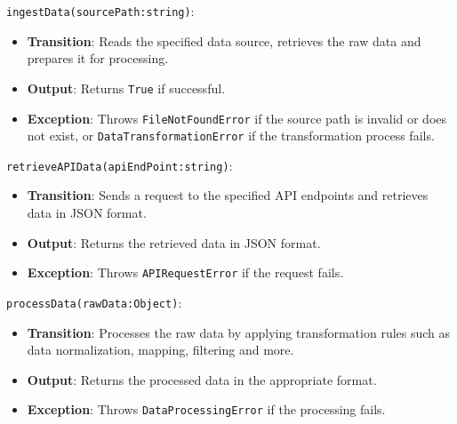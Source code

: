 \documentclass[12pt, titlepage]{article}
\begin{document}
\begin{description}
  \texttt{ingestData(sourcePath:string)}:
  \item
  \begin{itemize}
    \item \textbf{Transition}: Reads the specified data source, retrieves the raw data and prepares
    it for processing.
  \end{itemize}
  \item
  \begin{itemize}
    \item \textbf{Output}: Returns \texttt{True} if successful.
  \end{itemize}
  \item
  \begin{itemize}
    \item \textbf{Exception}: Throws \texttt{FileNotFoundError} if the source
    path is invalid or does not exist, or \texttt{DataTransformationError} if
    the transformation process fails.
  \end{itemize}
  \item

  \texttt{retrieveAPIData(apiEndPoint:string)}:
  \item
  \begin{itemize}
    \item \textbf{Transition}: Sends a request to the specified API endpoints and retrieves data in JSON
    format.
  \end{itemize}
  \item 
  \begin{itemize}
    \item \textbf{Output}: Returns the retrieved data in JSON format.
  \end{itemize}
  \item
  \begin{itemize}
    \item \textbf{Exception}: Throws \texttt{APIRequestError} if the request fails.
  \end{itemize}
  \item

  \texttt{processData(rawData:Object)}:
  \item
  \begin{itemize}
    \item \textbf{Transition}: Processes the raw data by applying transformation rules such as data
    normalization, mapping, filtering and more.
  \end{itemize}
  \item
  \begin{itemize}
    \item \textbf{Output}: Returns the processed data in the appropriate format.
  \end{itemize}
  \item
  \begin{itemize}
    \item \textbf{Exception}: Throws \texttt{DataProcessingError} if the processing fails.
  \end{itemize}
  \item


\end{description}
\end{document}

